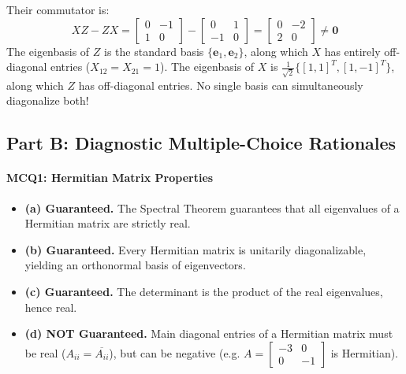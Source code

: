 \begin{enumerate}[label=(\alph*)]
    Their commutator is:
    \begin{equation*}
    XZ - ZX = \begin{bmatrix} 0 & -1 \\ 1 & 0 \end{bmatrix} - \begin{bmatrix} 0 & 1 \\ -1 & 0 \end{bmatrix} = \begin{bmatrix} 0 & -2 \\ 2 & 0 \end{bmatrix} \ne \mathbf{0}
    \end{equation*}
    The eigenbasis of $Z$ is the standard basis $\{\mathbf{e}_1, \mathbf{e}_2\}$, along which $X$ has entirely off-diagonal entries ($X_{12} = X_{21} = 1$). The eigenbasis of $X$ is $\frac{1}{\sqrt{2}}\{[1, 1]^T, [1, -1]^T\}$, along which $Z$ has off-diagonal entries. No single basis can simultaneously diagonalize both!
\end{enumerate}

\subsection*{Part B: Diagnostic Multiple-Choice Rationales}

\paragraph{MCQ1: Hermitian Matrix Properties}
\begin{itemize}
    \item \textbf{(a) Guaranteed.} The Spectral Theorem guarantees that all eigenvalues of a Hermitian matrix are strictly real.
    \item \textbf{(b) Guaranteed.} Every Hermitian matrix is unitarily diagonalizable, yielding an orthonormal basis of eigenvectors.
    \item \textbf{(c) Guaranteed.} The determinant is the product of the real eigenvalues, hence real.
    \item \textbf{(d) NOT Guaranteed.} Main diagonal entries of a Hermitian matrix must be real ($A_{ii} = \overline{A_{ii}}$), but can be negative (e.g. $A = \begin{bmatrix} -3 & 0 \\ 0 & -1 \end{bmatrix}$ is Hermitian).
\end{itemize}

